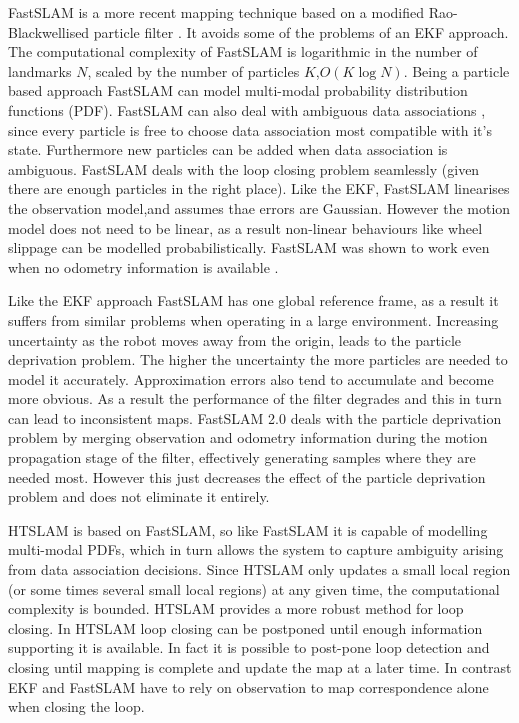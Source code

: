 
FastSLAM is a more recent mapping technique based on a modified
Rao-Blackwellised particle filter \cite{fastslam, fastslam2}. It
avoids some of the problems of an EKF approach. The computational
complexity of FastSLAM is logarithmic in the number of landmarks $N$,
scaled by the number of particles $K$,$O(K \log N)$. Being a particle
based approach FastSLAM can model multi-modal probability distribution
functions (PDF). FastSLAM can also deal with ambiguous data
associations \cite{Montemerlo02d}, since every particle is free to
choose data association most compatible with it's state. Furthermore
new particles can be added when data association is
ambiguous. FastSLAM deals with the loop closing problem seamlessly
(given there are enough particles in the right place). Like the EKF,
FastSLAM linearises the observation model,and assumes thae errors are
Gaussian. However the motion model does not need to be linear, as a result
non-linear behaviours like wheel slippage can be modelled
probabilistically. FastSLAM was shown to work even when no odometry
information is available \cite{fastslam}.

Like the EKF approach FastSLAM has one global reference frame, as a
result it suffers from similar problems when operating in a large
environment. Increasing uncertainty as the robot moves away from the
origin, leads to the particle deprivation problem. The higher the
uncertainty the more particles are needed to model it accurately.
Approximation errors also tend to accumulate and become more obvious.
As a result the performance of the filter degrades and this in turn
can lead to inconsistent maps. FastSLAM 2.0 \cite{fastslam2} deals
with the particle deprivation problem by merging observation and
odometry information during the motion propagation stage of the filter,
effectively generating samples where they are needed most. However
this just decreases the effect of the particle deprivation problem and
does not eliminate it entirely.

HTSLAM is based on FastSLAM, so like FastSLAM it is capable of
modelling multi-modal PDFs, which in turn allows the system to capture
ambiguity arising from data association decisions. Since HTSLAM
only updates a small local region (or some times several small local
regions) at any given time, the computational complexity is
bounded. HTSLAM provides a more robust method for loop closing. In
HTSLAM loop closing can be postponed until enough information
supporting it is available. In fact it is possible to post-pone loop
detection and closing until mapping is complete and update the map at
a later time. In contrast EKF and FastSLAM have to rely on observation
to map correspondence alone when closing the loop.

